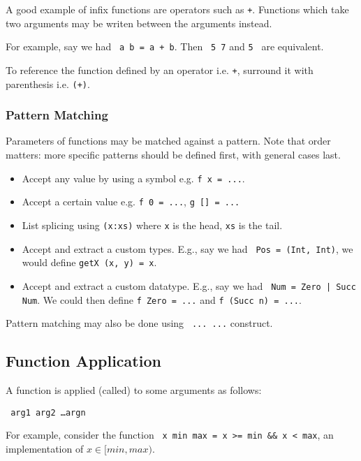 A good example of infix functions are operators such as \texttt{+}. Functions which take two arguments may be writen between the arguments instead.

For example, say we had \texttt{ a b = a + b}. Then \texttt{ 5 7} and \texttt{5 \textasciigrave{}} are equivalent.

To reference the function defined by an operator i.e. \texttt{+}, surround it with parenthesis i.e. \texttt{(+)}.

\subsubsection{Pattern Matching}

Parameters of functions may be matched against a pattern. Note that order matters: more specific patterns should be defined first, with general cases last.
\begin{itemize}
  \item Accept any value by using a symbol e.g. \texttt{f x = ...}.
  \item Accept a certain value e.g. \texttt{f 0 = ...}, \texttt{g [] = ...}
  \item List splicing using \texttt{(x:xs)} where \texttt{x} is the head, \texttt{xs} is the tail.
  \item Accept and extract a custom types. E.g., say we had \texttt{ Pos = (Int, Int)}, we would define \texttt{getX (x, y) = x}.
  \item Accept and extract a custom datatype. E.g., say we had \texttt{ Num = Zero | Succ Num}. We could then define \texttt{f Zero = ...} and \texttt{f (Succ n) = ...}.
\end{itemize}

Pattern matching may also be done using \texttt{ ...  ...} construct.

\subsection{Function Application}

A function is applied (called) to some arguments as follows:

\begin{center}
  \texttt{ arg1 arg2 \ldots argn}
\end{center}

For example, consider the function \texttt{ x min max = x >= min \&\& x < max}, an implementation of $x \in [min, max)$.

